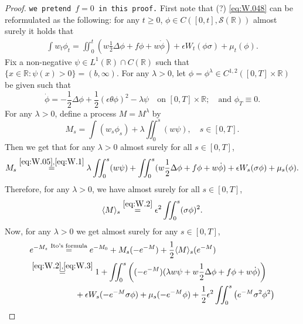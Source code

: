 \documentclass[12pt,a4paper]{amsart}
\numberwithin{equation}{section}
\theoremstyle{plain}
\theoremstyle{remark}
\begin{document}
\begin{proof}
	{\tt we pretend $f = 0$ in this proof.}
	First note that (?) \eqref{eq:W.048} can be reformulated as the following: 
	for any $t\geq 0$, $\phi \in C([0,t], \mathscr S(\mathbb R))$ almost surely it holds that 
\begin{equation} \label{eq:W.05}\begin{multlined}
	\int w_t\phi_t  = \iint_0^t \left(w\frac{1}{2}\Delta\phi + f \phi + w \dot \phi\right) + \epsilon W_t(\phi\sigma) + \mu_t(\phi).
\end{multlined} \end{equation}
	Fix a non-negative $\psi \in L^1(\mathbb R) \cap C(\mathbb R)$ such that $\{x\in \mathbb R: \psi(x)>0\}=(b, \infty)$.
	For any $\lambda > 0$, let $\phi = \phi^{\lambda} \in C^{1,2}([0,T] \times \mathbb R)$ be given such that
\begin{equation} \label{eq:W.06}
	\dot \phi =- \frac{1}{2}\Delta \phi+  \frac{1}{2}(\epsilon\theta \phi)^2  - \lambda \psi \quad \text{on~} [0,T]\times \mathbb R; \quad \text{and~} \phi_T \equiv 0.
\end{equation}	
	For any $\lambda > 0$, define a process $M=M^{\lambda}$ by
\begin{equation} \label{eq:W.1}
	M_s
	= \int (w_s \phi_s) + \lambda \iint_0^s (w \psi), 
	\quad s \in [0,T].
\end{equation}
	Then we get that for any $\lambda > 0$ almost surely for all $s\in [0,T]$,
\begin{equation} \label{eq:W.2}
	M_s
	\overset{\eqref{eq:W.05}, \eqref{eq:W.1}}= \lambda \iint_0^s (w \psi) + \iint_0^s (w\frac{1}{2}\Delta\phi + f\phi + w \dot \phi) + \epsilon W_s(\sigma\phi) + \mu_s(\phi).
\end{equation}
	Therefore, for any $\lambda > 0$, we have almost surely for all $s\in [0,T]$,
\begin{equation} \label{eq:W.3}
	\langle M \rangle_s
	\overset{\eqref{eq:W.2}}= \epsilon^2 \iint_0^s (\sigma \phi)^2.
\end{equation}
	Now, for any $\lambda > 0$ we get almost surely for any $s\in [0,T]$,
\begin{align}
	& e^{-M_s} 
	\overset{\text{Ito's formula}}= e^{- M_0} + M_s(-e^{-M}) + \frac{1}{2} \langle M\rangle_s( e^{-M}) 
\\&\begin{multlined}
	\overset{\eqref{eq:W.2}, \eqref{eq:W.3}}= 1 +  \iint_0^s \left((-e^{- M}) (\lambda w \psi +w \frac{1}{2} \Delta\phi + f \phi + w\dot \phi)\right)
	\\ \qquad  \qquad + \epsilon W_s(-e^{-M}\sigma\phi) + \mu_s(- e^{-M} \phi )+ \frac{1}{2}\epsilon ^2 \iint_0^s \left(e^{-M} \sigma^2\phi^2 \right)

\end{multlined}
\end{align}
\end{proof}
\end{document}
